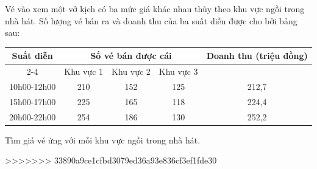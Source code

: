 \begin{bt}
	Vé vào xem một vở kịch có ba mức giá khác nhau thùy theo khu vực ngồi trong nhà hát. Số lượng vé bán ra và doanh thu của ba suất diễn được cho bởi bảng sau: 
	\begin{center}
		\begin{tabular}{|c|c|c|c|c|}
			\hline
			\multirow{2}{*}{Suất diễn }&\multicolumn{3}{c|}{Số vé bán được cái}&\multirow{2}{*}{Doanh thu (triệu đồng)}\\ \cline{2-4}
			& Khu vực 1 & Khu vực 2 & Khu vực 3&  \\ \hline
			10h00-12h00 & 210 & 152 & 125 &212,7 \\ \hline
			15h00-17h00 & 225 & 165 & 118 &224,4 \\ \hline
			20h00-22h00 &254 &186 & 130 &252,2 \\ \hline
		\end{tabular}
	\end{center}
	Tìm giá vé ứng với mỗi khu vực ngồi trong nhà hát.
\end{bt}

>>>>>>> 33890a9ce1cfbd3079ed36a93e836cf3ef1fde30
